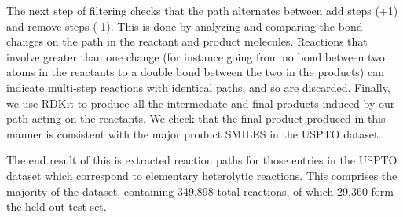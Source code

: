 The next step of filtering checks that the path alternates between add steps (+1) and remove steps (-1). 
This is done by analyzing and comparing the bond changes on the path in the reactant and product molecules. 
Reactions that involve greater than one change (for instance going from no bond between two atoms in the reactants to a double bond between the two in the products) can indicate multi-step 
reactions with identical paths, and so are discarded.
Finally, we use RDKit to produce all the intermediate and final products induced by our path acting on the reactants.
We check that the final product produced in this manner is consistent with the major product SMILES in the USPTO dataset. 


The end result of this is extracted reaction paths for those entries in the USPTO dataset which 
correspond to elementary heterolytic reactions.
This comprises the majority of the dataset, containing 349,898 total reactions, of which 29,360 form the held-out test set.


